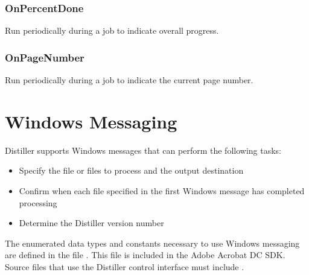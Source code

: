 \documentclass[letterpaper,12pt,english,openany,oneside]{sphinxmanual}
\begin{document}
\subsection{OnPercentDone}
\label{\detokenize{Distiller_AutomationIntro:onpercentdone}}
Run periodically during a job to indicate overall progress.


\begin{sphinxVerbatim}[commandchars=\\\{\}]
     
\end{sphinxVerbatim}




\subsection{OnPageNumber}
\label{\detokenize{Distiller_AutomationIntro:onpagenumber}}
Run periodically during a job to indicate the current page number.


\begin{sphinxVerbatim}[commandchars=\\\{\}]
     
\end{sphinxVerbatim}


\chapter{Windows Messaging}
\label{\detokenize{Distiller_WinIntro:windows-messaging}}\label{\detokenize{Distiller_WinIntro::doc}}
Distiller supports Windows messages that can perform the following tasks:
\begin{itemize}
\item {} 
Specify the file or files to process and the output destination

\item {} 
Confirm when each file specified in the first Windows message has completed processing

\item {} 
Determine the Distiller version number

\end{itemize}

The enumerated data types and constants necessary to use Windows messaging are defined in the file  . This file is included in the Adobe Acrobat DC SDK. Source files that use the Distiller control interface must include  .
\end{document}
